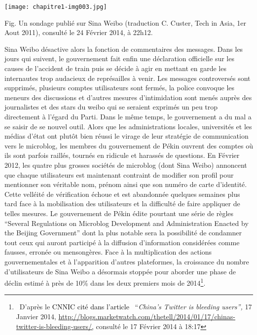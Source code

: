 \bigskip



\begin{center}
\texttt{[image: chapitre1-img003.jpg]}
\end{center}
{\color{black}
Fig. Un sondage publi\'e sur Sina Weibo (traduction C. Custer, Tech in Asia, 1er Aout 2011), consult\'e le 24 F\'evrier
2014, \`a 22h12.}


\bigskip

{\color{black}
Sina Weibo d\'esactive alors la fonction de commentaires des messages. Dans les jours qui suivent, le gouvernement fait
enfin une d\'eclaration officielle sur les causes de l'accident de train puis se d\'ecide \`a agir en mettant en garde
les internautes trop audacieux de repr\'esailles \`a venir. Les messages controvers\'es sont supprim\'es, plusieurs
comptes utilisateurs sont ferm\'es, la police convoque les meneurs des discussions et d'autres mesures d'intimidation
sont men\'es aupr\`es des journalistes et des stars du weibo qui se seraient exprim\'es un peu trop directement \`a
l'\'egard du Parti. Dans le m\^eme temps, le gouvernement a du mal a se saisir de se nouvel outil. Alors que les
administrations locales, universit\'es et les m\'edias d'\'etat ont plut\^ot bien r\'eussi le virage de leur
strat\'egie de communication vers le microblog, les membres du gouvernement de P\'ekin ouvrent des comptes o\`u ils
sont parfois raill\'es, tourn\'es en ridicule et harass\'es de questions. En F\'evrier 2012, les quatre plus grosses
soci\'et\'es de microblog (dont Sina Weibo) annoncent que chaque utilisateurs est maintenant contraint de modifier son
profil pour mentionner son v\'eritable nom, pr\'enom ainsi que son num\'ero de carte d'identit\'e. Cette vell\'eit\'e
de v\'erification \'echoue et est abandonn\'ee quelques semaines plus tard face \`a la mobilisation des utilisateurs et
la difficult\'e de faire appliquer de telles mesures. Le gouvernement de P\'ekin \'edite pourtant une s\'erie de
r\`egles ``Several Regulations on Microblog Development and Administration Enacted by the Beijing Government'' dont la
plus notable sera la possibilit\'e de condamner tout ceux qui auront particip\'e \`a la diffusion d'information
consid\'er\'ees comme fausses, erron\'ee ou mensong\`eres. Face \`a la multiplication des actions gouvernementales et
\`a l'apparition d'autres plateformes, la croissance du nombre d'utilisateurs de Sina Weibo a d\'esormais stopp\'ee
pour aborder une phase de d\'eclin estim\'e \`a pr\`es de 10\% dans les deux premiers mois de
2014\footnote{\textsf{\ }\textsf{D'apr\`es le }\textcolor{black}{CNNIC cit\'e dans l'article
}\textsf{\ {}``}\textsf{\textit{China's Twitter is bleeding users'', }}\textsf{17 Janvier 2014,
}\url{http://blogs.marketwatch.com/thetell/2014/01/17/chinas-twitter-is-bleeding-users/,}\textsf{ consult\'e le 17
F\'evrier 2014 \`a 18:17}}. }


